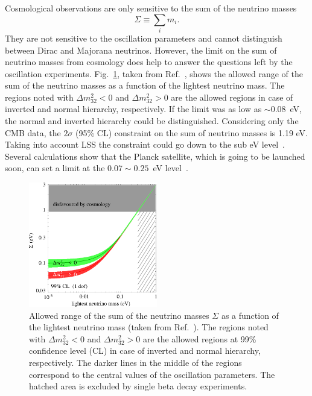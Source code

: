Cosmological observations are only sensitive to the sum of the neutrino masses
\begin{equation}
  \label{eq:msum}
  \Sigma \equiv \sum_{i}m_{i}.
\end{equation}
They are not sensitive to the oscillation parameters and cannot distinguish between Dirac and Majorana neutrinos. However, the limit on the sum of neutrino masses from cosmology does help to answer the questions left by the oscillation experiments. Fig.~\ref{fig:sumVSlightest}, taken from Ref.~\cite{Str05}, shows the allowed range of the sum of the neutrino masses as a function of the lightest neutrino mass. The regions noted with $\Delta m^{2}_{32}<0$ and $\Delta m^{2}_{32}>0$ are the allowed regions in case of inverted and normal hierarchy, respectively. If the limit was as low as $\sim 0.08$~eV, the normal and inverted hierarchy could be distinguished. Considering only the CMB data, the $2\sigma$ (95\% CL) constraint on the sum of neutrino masses is 1.19 eV. Taking into account LSS the constraint could go down to the sub eV level~\cite{Fog08}. Several calculations show that the Planck satellite, which is going to be launched soon, can set a limit at the $0.07 \sim 0.25$~eV level~\cite{Pla05}.
\begin{figure}[tbhp]
  \centering
  \includegraphics[width=0.5\textwidth]{sumVSlightest}  
  \caption{Allowed range of the sum of the neutrino masses $\Sigma$ as     a function of the lightest neutrino mass (taken from     Ref.~\cite{Str05}). The regions noted with $\Delta m^{2}_{32}<0$     and $\Delta m^{2}_{32}>0$ are the allowed regions at 99\%     confidence level (CL) in case of inverted and normal hierarchy,     respectively. The darker lines in the middle of the regions     correspond to the central values of the oscillation parameters.     The hatched area is excluded by single beta decay experiments.}
  \label{fig:sumVSlightest}
\end{figure}

